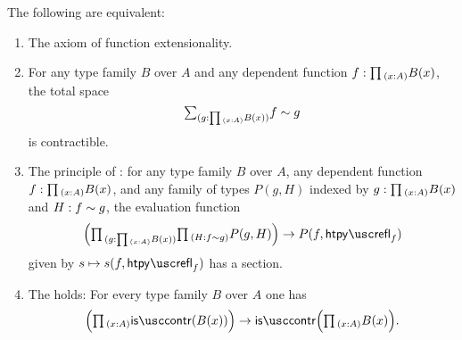 \begin{thm}\label{thm:funext_wkfunext}
The following are equivalent:
\begin{enumerate}
\item The axiom of function extensionality.
\item For any type family $B$ over $A$ and any dependent function $f:\prd{x:A}B(x)$, the total space
  \begin{equation*}
    \sm{g:\prd{x:A}B(x)}f\htpy g
  \end{equation*}
  is contractible.
\item
  The principle of :
  for any type family $B$ over $A$, any dependent function $f:\prd{x:A}B(x)$, and any family of types $P(g,H)$ indexed by $g:\prd{x:A}B(x)$ and $H:f\sim g$, the evaluation function
\begin{equation*}
\Big(\prd{g:\prd{x:A}B(x)}{H:f\htpy g}P(g,H)\Big)\to P(f,\htpyrefl_f)
\end{equation*}
given by $s\mapsto s(f,\htpyrefl_f)$ has a section.
\item The  holds: For every type family $B$ over $A$ one has
\begin{equation*}
\Big(\prd{x:A}\iscontr(B(x))\Big)\to\iscontr\Big(\prd{x:A}B(x)\Big).
\end{equation*}
\end{enumerate}
\end{thm}

